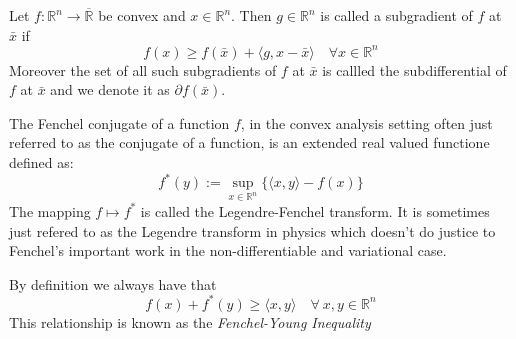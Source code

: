 %
\begin{definition}
	Let $f: \mathbb R^n \longrightarrow \overline{\mathbb R}$ be convex and
	$x\in\mathbb R^n$. Then $g\in\mathbb R^n$ is called a subgradient of
	$f$ at $\bar x$ if 
	\begin{equation*}
		f(x) \geq f(\bar x) +\langle g,x-\bar x\rangle \quad 
		\forall x\in\mathbb R^n 
	\end{equation*}
Moreover the set of all such subgradients of $f$ at $\bar x$ is callled the subdifferential
of $f$ at $\bar x$ and we denote it as $\partial f(\bar x)$.
\end{definition}
%
\begin{definition}
The Fenchel conjugate of a function $f$, in the convex analysis setting often
just referred to as the conjugate of a function, is an extended real valued
functione defined as:
\begin{equation*}
	f^*(y) := \sup_{x\in\mathbb R^n}\{\langle x,y\rangle - f(x)\}
\end{equation*}
The mapping $f\mapsto f^*$ is called the Legendre-Fenchel transform.
It is sometimes just refered to as the Legendre transform in physics which 
doesn't do justice to Fenchel's important work in the non-differentiable
and variational case.
\end{definition}
\noindent By definition we always have that
\begin{equation*} f(x)+f^*(y)\geq\langle x,y\rangle \quad \forall\ x,y\in 
\mathbb R^n\end{equation*}
This relationship is known as the \emph{Fenchel-Young Inequality}

